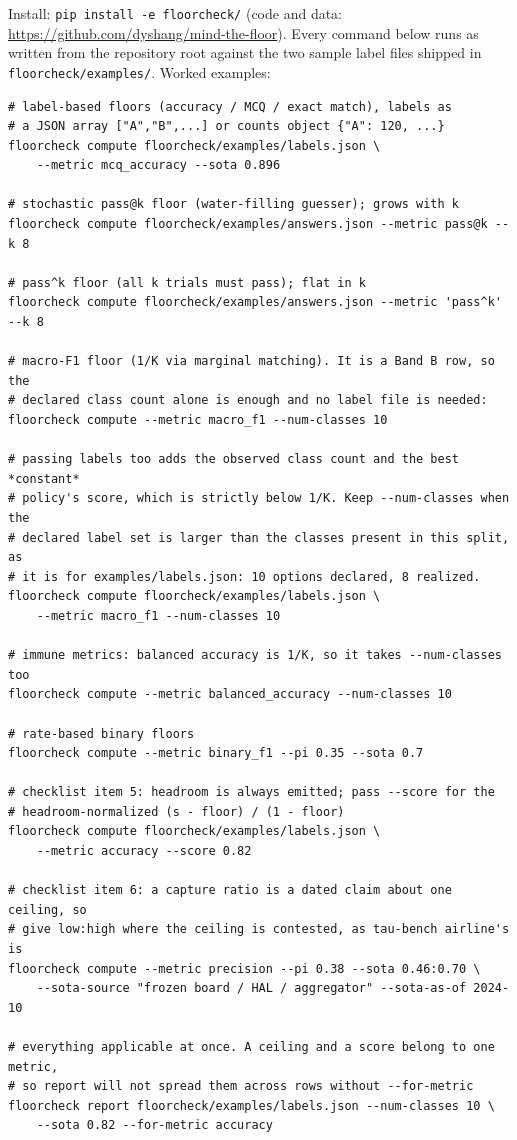 \documentclass{article}
\theoremstyle{plain}
\theoremstyle{definition}
\begin{document}
Install: \texttt{pip install -e floorcheck/} (code and data: \url{https://github.com/dyshang/mind-the-floor}). Every command below runs as written from the repository root against the two sample label files shipped in \texttt{floorcheck/examples/}. Worked examples:
\begin{verbatim}
# label-based floors (accuracy / MCQ / exact match), labels as
# a JSON array ["A","B",...] or counts object {"A": 120, ...}
floorcheck compute floorcheck/examples/labels.json \
    --metric mcq_accuracy --sota 0.896

# stochastic pass@k floor (water-filling guesser); grows with k
floorcheck compute floorcheck/examples/answers.json --metric pass@k --k 8

# pass^k floor (all k trials must pass); flat in k
floorcheck compute floorcheck/examples/answers.json --metric 'pass^k' --k 8

# macro-F1 floor (1/K via marginal matching). It is a Band B row, so the
# declared class count alone is enough and no label file is needed:
floorcheck compute --metric macro_f1 --num-classes 10

# passing labels too adds the observed class count and the best *constant*
# policy's score, which is strictly below 1/K. Keep --num-classes when the
# declared label set is larger than the classes present in this split, as
# it is for examples/labels.json: 10 options declared, 8 realized.
floorcheck compute floorcheck/examples/labels.json \
    --metric macro_f1 --num-classes 10

# immune metrics: balanced accuracy is 1/K, so it takes --num-classes too
floorcheck compute --metric balanced_accuracy --num-classes 10

# rate-based binary floors
floorcheck compute --metric binary_f1 --pi 0.35 --sota 0.7

# checklist item 5: headroom is always emitted; pass --score for the
# headroom-normalized (s - floor) / (1 - floor)
floorcheck compute floorcheck/examples/labels.json \
    --metric accuracy --score 0.82

# checklist item 6: a capture ratio is a dated claim about one ceiling, so
# give low:high where the ceiling is contested, as tau-bench airline's is
floorcheck compute --metric precision --pi 0.38 --sota 0.46:0.70 \
    --sota-source "frozen board / HAL / aggregator" --sota-as-of 2024-10

# everything applicable at once. A ceiling and a score belong to one metric,
# so report will not spread them across rows without --for-metric
floorcheck report floorcheck/examples/labels.json --num-classes 10 \
    --sota 0.82 --for-metric accuracy
\end{verbatim}
\end{document}
